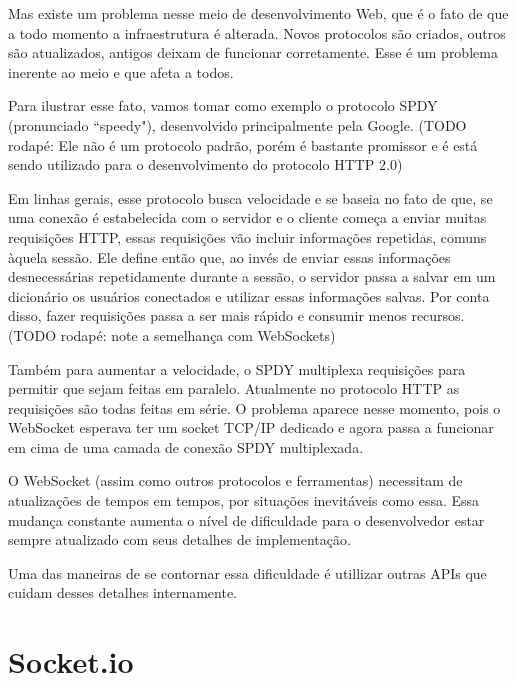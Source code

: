 \documentclass[a4paper,12pt]{article}
\begin{document}
Mas existe um problema nesse meio de desenvolvimento Web, que é o fato de que a todo momento a infraestrutura é alterada. Novos protocolos são criados, outros são atualizados, antigos deixam de funcionar corretamente. Esse é um problema inerente ao meio e que afeta a todos.

Para ilustrar esse fato, vamos tomar como exemplo o protocolo SPDY (pronunciado “speedy"), desenvolvido principalmente pela Google. (TODO rodapé: Ele não é um protocolo padrão, porém é bastante promissor e é está sendo utilizado para o desenvolvimento do protocolo HTTP 2.0)

Em linhas gerais, esse protocolo busca velocidade e se baseia no fato de que, se uma conexão é estabelecida com o servidor e o cliente começa a enviar muitas requisições HTTP, essas requisições vão incluir informações repetidas, comuns àquela sessão. Ele define então que, ao invés de enviar essas informações desnecessárias repetidamente durante a sessão, o servidor passa a salvar em um dicionário os usuários conectados e utilizar essas informações salvas. Por conta disso, fazer requisições passa a ser mais rápido e consumir menos recursos. (TODO rodapé: note a semelhança com WebSockets)

Também para aumentar a velocidade, o SPDY multiplexa requisições para permitir que sejam feitas em paralelo. Atualmente no protocolo HTTP as requisições são todas feitas em série. O problema aparece nesse momento, pois o WebSocket esperava ter um socket TCP/IP dedicado e agora passa a funcionar em cima de uma camada de conexão SPDY multiplexada.

O WebSocket (assim como outros protocolos e ferramentas) necessitam de  atualizações de tempos em tempos, por situações inevitáveis como essa. Essa mudança constante aumenta o nível de dificuldade para o desenvolvedor estar sempre atualizado com seus detalhes de implementação.

Uma das maneiras de se contornar essa dificuldade é utillizar outras APIs que cuidam desses detalhes internamente.


\section{Socket.io}


\end{document}
